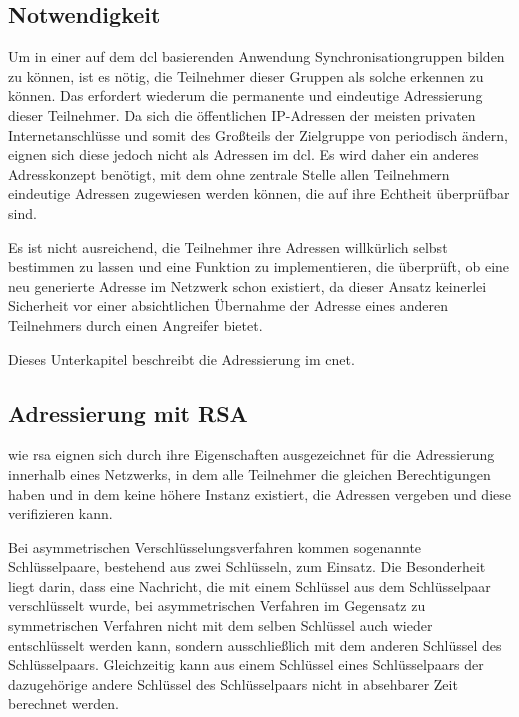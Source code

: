 
\subsection{Notwendigkeit}
Um in einer auf dem \gls{dcl} basierenden Anwendung Synchronisationgruppen bilden zu können, ist es
nötig, die Teilnehmer dieser Gruppen als solche erkennen zu können.
Das erfordert wiederum die permanente und eindeutige Adressierung dieser Teilnehmer.
Da sich die öffentlichen IP-Adressen der meisten privaten Internetanschlüsse und somit des Großteils der
Zielgruppe von \sblit periodisch ändern, eignen sich diese jedoch nicht als Adressen im \gls{dcl}.
Es wird daher ein anderes Adresskonzept benötigt, mit dem ohne zentrale Stelle
allen Teilnehmern eindeutige Adressen zugewiesen werden können, die auf ihre
Echtheit überprüfbar sind.

Es ist nicht ausreichend, die Teilnehmer ihre Adressen willkürlich selbst bestimmen zu lassen und eine
Funktion zu implementieren, die überprüft, ob eine neu generierte Adresse im Netzwerk schon existiert,
da dieser Ansatz keinerlei Sicherheit vor einer absichtlichen Übernahme der Adresse eines anderen
Teilnehmers durch einen Angreifer bietet.

Dieses Unterkapitel beschreibt die Adressierung im \gls{cnet}.


\subsection{Adressierung mit RSA}
 wie \gls{rsa} eignen sich durch ihre Eigenschaften
ausgezeichnet für die Adressierung innerhalb eines Netzwerks, in dem alle Teilnehmer die gleichen
Berechtigungen haben und in dem keine höhere Instanz existiert, die Adressen vergeben und diese
verifizieren kann.

Bei asymmetrischen Verschlüsselungsverfahren kommen sogenannte Schlüsselpaare, bestehend aus zwei
Schlüsseln, zum Einsatz. Die Besonderheit liegt darin, dass eine Nachricht, die mit einem Schlüssel
aus dem Schlüsselpaar verschlüsselt wurde, bei asymmetrischen Verfahren im Gegensatz zu symmetrischen
Verfahren nicht mit dem selben Schlüssel auch wieder entschlüsselt werden kann, sondern ausschließlich
mit dem anderen Schlüssel des Schlüsselpaars.
Gleichzeitig kann aus einem Schlüssel eines Schlüsselpaars der dazugehörige andere Schlüssel des
Schlüsselpaars nicht in absehbarer Zeit berechnet werden.

